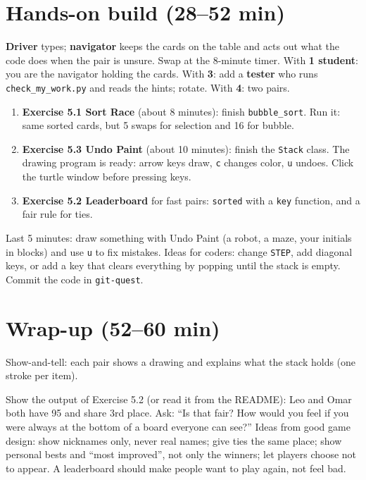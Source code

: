 \section{Hands-on build (28--52 min)}
\begin{pairroles}
\textbf{Driver} types; \textbf{navigator} keeps the cards on the table and acts out what the code does when the pair is unsure. Swap at the 8-minute timer.
With \textbf{1 student}: you are the navigator holding the cards. With \textbf{3}: add a \textbf{tester} who runs \texttt{check\_my\_work.py} and reads the hints; rotate. With \textbf{4}: two pairs.
\end{pairroles}
\begin{enumerate}[itemsep=2pt]
  \item \textbf{Exercise 5.1 Sort Race} (about 8 minutes): finish \texttt{bubble\_sort}. Run it: same sorted cards, but 5 swaps for selection and 16 for bubble.
  \item \textbf{Exercise 5.3 Undo Paint} (about 10 minutes): finish the \texttt{Stack} class. The drawing program is ready: arrow keys draw, \texttt{c} changes color, \texttt{u} undoes. Click the turtle window before pressing keys.
  \item \textbf{Exercise 5.2 Leaderboard} for fast pairs: \texttt{sorted} with a \texttt{key} function, and a fair rule for ties.
\end{enumerate}

\begin{freebuild}
Last 5 minutes: draw something with Undo Paint (a robot, a maze, your initials in blocks) and use \texttt{u} to fix mistakes. Ideas for coders: change \texttt{STEP}, add diagonal keys, or add a key that clears everything by popping until the stack is empty. Commit the code in \texttt{git-quest}.
\end{freebuild}

\section{Wrap-up (52--60 min)}
Show-and-tell: each pair shows a drawing and explains what the stack holds (one stroke per item).

\begin{safety}
Show the output of Exercise 5.2 (or read it from the README): Leo and Omar both have 95 and share 3rd place. Ask: \enquote{Is that fair? How would you feel if you were always at the bottom of a board everyone can see?} Ideas from good game design: show nicknames only, never real names; give ties the same place; show personal bests and \enquote{most improved}, not only the winners; let players choose not to appear. A leaderboard should make people want to play again, not feel bad.
\end{safety}

